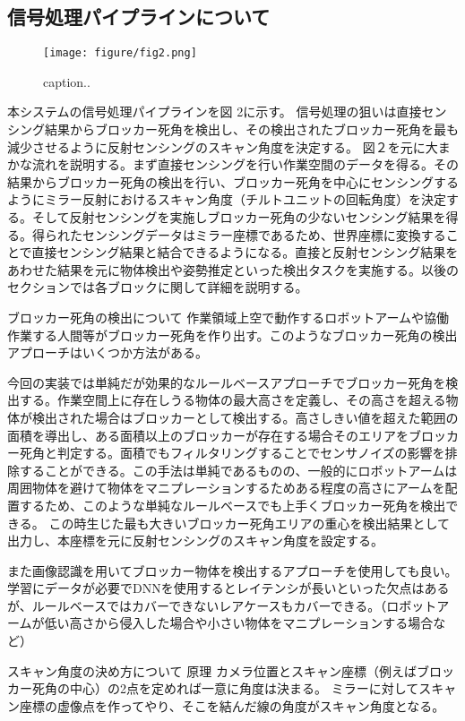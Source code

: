 \documentclass[xelatex,ja=standard]{bxjsarticle}
\begin{document}
\subsection{信号処理パイプラインについて}
\begin{figure*}[ht!]
\centering
  \texttt{[image: figure/fig2.png]}
  \caption{caption..}
  \label{fig-concept}
\end{figure*}
本システムの信号処理パイプラインを図 2に示す。
信号処理の狙いは直接センシング結果からブロッカー死角を検出し、その検出されたブロッカー死角を最も減少させるように反射センシングのスキャン角度を決定する。
図２を元に大まかな流れを説明する。まず直接センシングを行い作業空間のデータを得る。その結果からブロッカー死角の検出を行い、ブロッカー死角を中心にセンシングするようにミラー反射におけるスキャン角度（チルトユニットの回転角度）を決定する。そして反射センシングを実施しブロッカー死角の少ないセンシング結果を得る。得られたセンシングデータはミラー座標であるため、世界座標に変換することで直接センシング結果と結合できるようになる。直接と反射センシング結果をあわせた結果を元に物体検出や姿勢推定といった検出タスクを実施する。以後のセクションでは各ブロックに関して詳細を説明する。

	ブロッカー死角の検出について
作業領域上空で動作するロボットアームや協働作業する人間等がブロッカー死角を作り出す。このようなブロッカー死角の検出アプローチはいくつか方法がある。

今回の実装では単純だが効果的なルールベースアプローチでブロッカー死角を検出する。作業空間上に存在しうる物体の最大高さを定義し、その高さを超える物体が検出された場合はブロッカーとして検出する。高さしきい値を超えた範囲の面積を導出し、ある面積以上のブロッカーが存在する場合そのエリアをブロッカー死角と判定する。面積でもフィルタリングすることでセンサノイズの影響を排除することができる。この手法は単純であるものの、一般的にロボットアームは周囲物体を避けて物体をマニプレーションするためある程度の高さにアームを配置するため、このような単純なルールベースでも上手くブロッカー死角を検出できる。
この時生じた最も大きいブロッカー死角エリアの重心を検出結果として出力し、本座標を元に反射センシングのスキャン角度を設定する。

また画像認識を用いてブロッカー物体を検出するアプローチを使用しても良い。
学習にデータが必要でDNNを使用するとレイテンシが長いといった欠点はあるが、ルールベースではカバーできないレアケースもカバーできる。（ロボットアームが低い高さから侵入した場合や小さい物体をマニプレーションする場合など）

	スキャン角度の決め方について
原理
カメラ位置とスキャン座標（例えばブロッカー死角の中心）の2点を定めれば一意に角度は決まる。
ミラーに対してスキャン座標の虚像点を作ってやり、そこを結んだ線の角度がスキャン角度となる。
\end{document}
